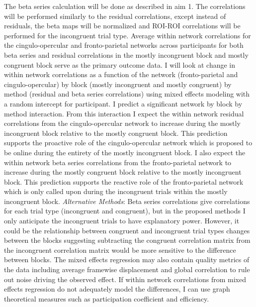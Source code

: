 \documentclass[phd,appendix,figures]{uithesis}
\begin{document}
The beta series calculation will be done as described in aim 1.
The correlations will be performed similarly to the residual correlations, except instead of residuals, the beta maps will be normalized and ROI-ROI correlations will be performed for the incongruent trial type.
Average within network correlations for the cingulo-opercular and fronto-parietal networks across participants for both beta series and residual correlations in the mostly incongruent block and mostly congruent block serve as the primary outcome data.
I will look at change in within network correlations as a function of the network (fronto-parietal and cingulo-opercular) by block (mostly incongruent and mostly congruent) by method (residual and beta series correlations) using mixed effects modeling with a random intercept for participant.
I predict a significant network by block by method interaction.
From this interaction I expect the within network residual correlations from the cingulo-opercular network to increase during the mostly incongruent block relative to the mostly congruent block.
This prediction supports the proactive role of the cingulo-opercular network which is proposed to be online during the entirety of the mostly incongruent block.
I also expect the within network beta series correlations from the fronto-parietal network to increase during the mostly congruent block relative to the mostly incongruent block.
This prediction supports the reactive role of the fronto-parietal network which is only called upon during the incongruent trials within the mostly incongruent block.
\newline
\newline
\textit{Alternative Methods}:
Beta series correlations give correlations for each trial type (incongruent and congruent), but in the proposed methods I only anticipate the incongruent trials to have explanatory power.
However, it could be the relationship between congruent and incongruent trial types changes between the blocks suggesting subtracting the congruent correlation matrix from the incongruent correlation matrix would be more sensitive to the difference between blocks.
The mixed effects regression may also contain quality metrics of the data including average framewise displacement and global correlation to rule out noise driving the observed effect. 
If within network correlations from mixed effects regression do not adequately model the differences, I can use graph theoretical measures such as participation coefficient and efficiency.
\newline
\end{document}
